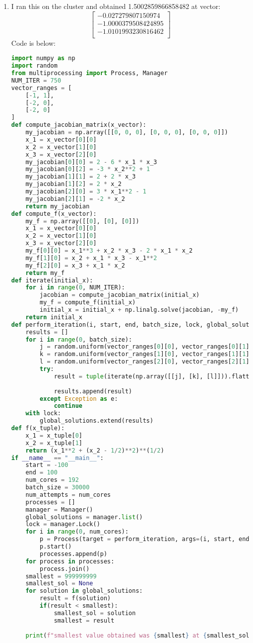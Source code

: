 \documentclass{article}
\begin{document}
\begin{enumerate}[label=\alph*.)]
\item I ran this on the cluster and obtained 1.5002859866858482 at vector: \\
\[
\begin{bmatrix}
-0.027279807150974 \\
-1.0000379508424895 \\
-1.0101993230816462 \\
\end{bmatrix}
\]
Code is below: \\
\begin{lstlisting}[language=Python]
import numpy as np
import random
from multiprocessing import Process, Manager
NUM_ITER = 750
vector_ranges = [
    [-1, 1],
    [-2, 0],
    [-2, 0]
]
def compute_jacobian_matrix(x_vector):
    my_jacobian = np.array([[0, 0, 0], [0, 0, 0], [0, 0, 0]])
    x_1 = x_vector[0][0]
    x_2 = x_vector[1][0]
    x_3 = x_vector[2][0]
    my_jacobian[0][0] = 2 - 6 * x_1 * x_3
    my_jacobian[0][2] = -3 * x_2**2 + 1
    my_jacobian[1][1] = 2 + 2 * x_3
    my_jacobian[1][2] = 2 * x_2
    my_jacobian[2][0] = 3 * x_1**2 - 1
    my_jacobian[2][1] = -2 * x_2
    return my_jacobian
def compute_f(x_vector):
    my_f = np.array([[0], [0], [0]])
    x_1 = x_vector[0][0]
    x_2 = x_vector[1][0]
    x_3 = x_vector[2][0]
    my_f[0][0] = x_1**3 + x_2 * x_3 - 2 * x_1 * x_2
    my_f[1][0] = x_2 + x_1 * x_3 - x_1**2
    my_f[2][0] = x_3 + x_1 * x_2
    return my_f
def iterate(initial_x):
    for i in range(0, NUM_ITER):
        jacobian = compute_jacobian_matrix(initial_x)
        my_f = compute_f(initial_x)
        initial_x = initial_x + np.linalg.solve(jacobian, -my_f)
    return initial_x
def perform_iteration(i, start, end, batch_size, lock, global_solutions):
    results = []
    for i in range(0, batch_size):
        j = random.uniform(vector_ranges[0][0], vector_ranges[0][1])
        k = random.uniform(vector_ranges[1][0], vector_ranges[1][1])
        l = random.uniform(vector_ranges[2][0], vector_ranges[2][1])
        try:
            result = tuple(iterate(np.array([[j], [k], [l]])).flatten())
            
            results.append(result)
        except Exception as e:
            continue
    with lock:
        global_solutions.extend(results)
def f(x_tuple):
    x_1 = x_tuple[0]
    x_2 = x_tuple[1]
    return (x_1**2 + (x_2 - 1/2)**2)**(1/2)
if __name__ == "__main__":
    start = -100
    end = 100
    num_cores = 192
    batch_size = 30000
    num_attempts = num_cores
    processes = []
    manager = Manager()
    global_solutions = manager.list()
    lock = manager.Lock()
    for i in range(0, num_cores):
        p = Process(target = perform_iteration, args=(i, start, end, batch_size, lock, global_solutions))
        p.start()
        processes.append(p)
    for process in processes:
        process.join()
    smallest = 999999999
    smallest_sol = None
    for solution in global_solutions:
        result = f(solution)
        if(result < smallest):
            smallest_sol = solution
            smallest = result
    
    print(f"smallest value obtained was {smallest} at {smallest_sol}")
\end{lstlisting}
\end{enumerate}
\end{document}
